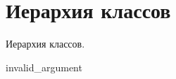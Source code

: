 \section{Иерархия классов}
Иерархия классов.\begin{DoxyCompactList}
\item invalid\+\_\+argument\begin{DoxyCompactList}
\item {}
\end{DoxyCompactList}
\item {}
\end{DoxyCompactList}
